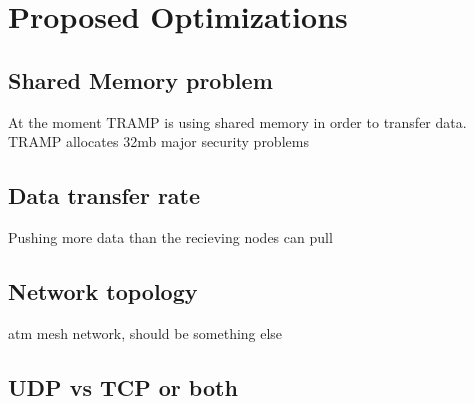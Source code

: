 \section{Proposed Optimizations}
\label{sec:optimizations}

\subsection{Shared Memory problem}
At the moment TRAMP is using shared memory in order to transfer data. TRAMP allocates 32mb
major security problems

\subsection{Data transfer rate}
Pushing more data than the recieving nodes can pull

\subsection{Network topology}
atm mesh network, should be something else

\subsection{UDP vs TCP or both}






